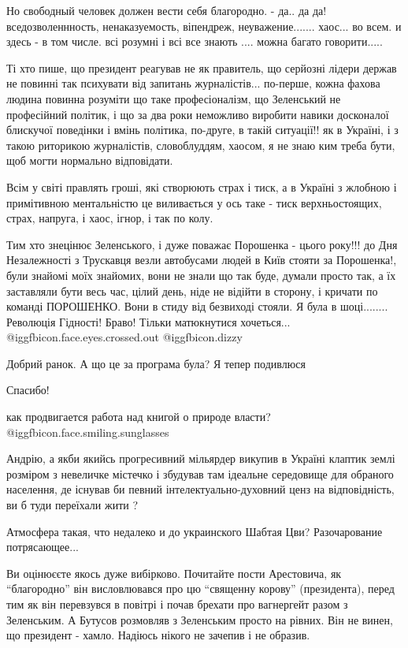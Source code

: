 \begin{itemize}
Но свободный человек должен вести себя благородно. - да.. да да!
вседозволеннность, ненаказуемость, віпендреж, неуважение....... хаос... во
всем. и здесь - в том числе. всі розумні і всі все знають .... можна багато
говорити.....


Ті хто пише, що президент реагував не як правитель, що серйозні лідери держав
не повинні так психувати від запитань журналістів... по-перше, кожна фахова
людина повинна розуміти що таке професіоналізм, що Зеленський не професійний
політик, і що за два роки неможливо виробити навики досконалої блискучої
поведінки і вмінь політика, по-друге, в такій ситуації!! як в Україні, і з
такою риторикою журналістів, словоблуддям, хаосом, я не знаю ким треба бути,
щоб могти нормально відповідати.

Всім у світі правлять гроші, які створюють страх і тиск, а в Україні з жлобною
і примітивною ментальністю це виливається у ось таке - тиск верхньостоящих,
страх, напруга, і хаос, ігнор, і так по колу.

Тим хто знецінює Зеленського, і дуже поважає Порошенка - цього року!!! до Дня
Незалежності з Трускавця везли автобусами людей в Київ стояти за Порошенка!,
були знайомі моїх знайомих, вони не знали що так буде, думали просто так, а їх
заставляли бути весь час, цілий день, ніде не відійти в сторону, і кричати по
команді ПОРОШЕНКО. Вони в стиду від безвиході стояли. Я була в шоці........
Революція Гідності! Браво! Тільки матюкнутися хочеться...  @igg{fbicon.face.eyes.crossed.out}  @igg{fbicon.dizzy} 

Добрий ранок. А що це за програма була? Я тепер подивлюся

Спасибо!

как продвигается работа над книгой о природе власти?  @igg{fbicon.face.smiling.sunglasses} 


Андрію, а якби якийсь прогресивний мільярдер викупив в Україні клаптик землі
розміром з невеличке містечко і збудував там ідеальне середовище для обраного
населення, де існував би певний інтелектуально-духовний ценз на відповідність,
ви б туди переїхали жити ?

Атмосфера такая, что недалеко и до украинского Шабтая Цви? Разочарование потрясающее...


Ви оцінюєєте якось дуже вибірково. Почитайте пости Арестовича, як \enquote{благородно}
він висловлювався про цю \enquote{священну корову} (президента), перед тим як він
перевзувся в повітрі і почав брехати про вагнергейт разом з Зеленським. А
Бутусов розмовляв з Зеленським просто на рівних. Він не винен, що президент -
хамло. Надіюсь нікого не зачепив і не образив.


\end{itemize}
